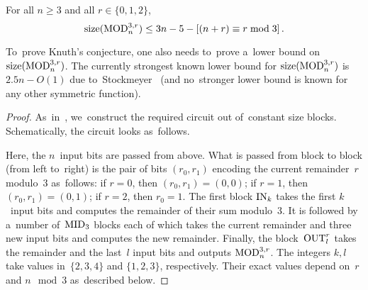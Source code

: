 \begin{theorem}\label{theorem:mod3upper}
For all $n \ge 3$ and all $r \in \{0,1,2\}$,
\[\operatorname{size}(\operatorname{MOD}_n^{3,r}) \le 3n-5-[(n+r) \equiv r\bmod 3] \,. \]
\end{theorem}

To~prove Knuth's conjecture, one also needs to~prove a~lower bound on $\operatorname{size}(\operatorname{MOD}_n^{3,r})$. The currently strongest known lower bound for $\operatorname{size}(\operatorname{MOD}_n^{3,r})$
is~$2.5n-O(1)$ due to~Stockmeyer~\cite{DBLP:journals/mst/Stockmeyer77}
(and no~stronger lower bound is known for any other symmetric function).

\begin{proof}
As~in~\cite{DBLP:conf/sat/KojevnikovKY09},
we~construct the required circuit out of~constant size blocks. Schematically, the circuit looks as~follows.

\begin{center}
\end{center}
%
Here, the $n$~input bits are passed from above.
What is passed from block to block (from left to~right)
is the pair of bits $(r_0, r_1)$ encoding the current remainder~$r$ modulo~$3$ as~follows: if $r=0$, then $(r_0,r_1)=(0,0)$; if $r=1$, then $(r_0,r_1)=(0,1)$; if $r=2$, then $r_0=1$. The first block $\operatorname{IN}_k$ takes the first $k$~input bits and computes the remainder of their sum modulo~$3$. It is followed by a~number of~$\operatorname{MID}_3$ blocks each of which takes the current remainder and three new input bits and computes the new remainder. Finally, the block~$\operatorname{OUT}_l^r$ takes the remainder and the last~$l$ input bits and outputs $\operatorname{MOD}_n^{3,r}$. The integers $k,l$ take values in~$\{2,3,4\}$ and $\{1,2,3\}$, respectively. Their exact values depend on~$r$ and $n \mod 3$ as~described below.


\end{proof}
